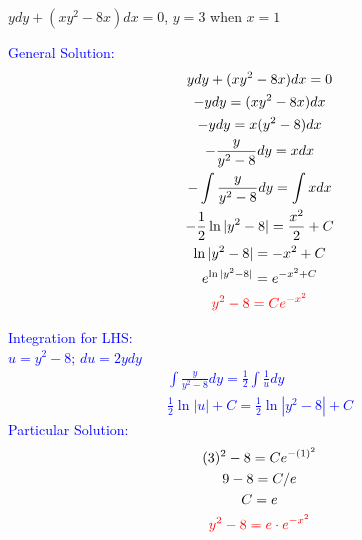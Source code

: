 \item $y dy + (xy^2 - 8x) dx = 0$, $y=3$ when $x=1$

\textcolor{blue}{
    \begin{minipage}[t]{0.45\textwidth}
        General Solution:
        \begin{gather*}
            y dy + (xy^2 - 8x) dx = 0\\
            -y dy = (xy^2 - 8x) dx\\
            -y dy = x(y^2-8) dx\\
            -\frac{y}{y^2-8} dy = x dx\\
            -\int\frac{y}{y^2-8} dy = \int x dx\\
            -\frac{1}{2}\ln|y^2-8|=\frac{x^2}{2}+C\\
            \ln|y^2-8|=-x^2+C\\
            e^{\ln|y^2-8|}=e^{-x^2+C}\\
            \textcolor{red}{
            y^2-8=Ce^{-x^2}
            }
        \end{gather*}
    \end{minipage}
    \hfill
    \begin{minipage}[t]{0.45\textwidth}
        Integration for LHS:\\
        $u=y^2-8$; $du=2ydy$
        \begin{gather*}
            \int\frac{y}{y^2-8} dy = \frac{1}{2}\int\frac{1}{u} dy\\
            \frac{1}{2}\ln|u|+C=\frac{1}{2}\ln|y^2-8|+C
        \end{gather*}
        Particular Solution:
        \begin{gather*}
            (3)^2-8=Ce^{-(1)^2}\\
            9-8=C/e\\
            C=e\\
            \textcolor{red}{
                y^2-8=e \cdot e^{-x^2}
            }
        \end{gather*}
    \end{minipage}
}